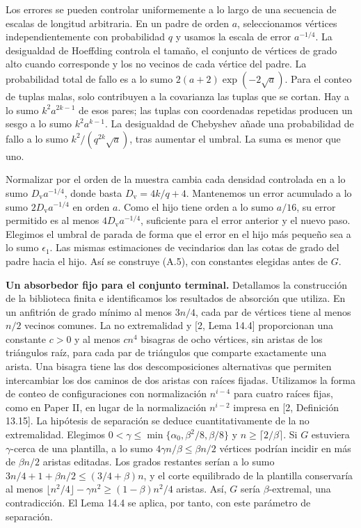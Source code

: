 \documentclass[spanish,11pt,a4paper]{article}
\begin{document}
Los errores se pueden controlar uniformemente a lo largo de una secuencia de escalas de longitud arbitraria. En un padre de orden \(a\), seleccionamos vértices independientemente con probabilidad \(q\) y usamos la escala de error \(a^{-1/4}\). La desigualdad de Hoeffding controla el tamaño, el conjunto de vértices de grado alto cuando corresponde y los no vecinos de cada vértice del padre. La probabilidad total de fallo es a lo sumo \(2(a+2)\exp(-2\sqrt a)\). Para el conteo de tuplas malas, solo contribuyen a la covarianza las tuplas que se cortan. Hay a lo sumo \(k^2a^{2k-1}\) de esos pares; las tuplas con coordenadas repetidas producen un sesgo a lo sumo \(k^2a^{k-1}\). La desigualdad de Chebyshev añade una probabilidad de fallo a lo sumo \(k^2/(q^{2k}\sqrt a)\), tras aumentar el umbral. La suma es menor que uno.

Normalizar por el orden de la muestra cambia cada densidad controlada en a lo sumo \(D_{\mathrm v}a^{-1/4}\), donde basta \(D_{\mathrm v}=4k/q+4\). Mantenemos un error acumulado a lo sumo \(2D_{\mathrm v}a^{-1/4}\) en orden \(a\). Como el hijo tiene orden a lo sumo \(a/16\), su error permitido es al menos \(4D_{\mathrm v}a^{-1/4}\), suficiente para el error anterior y el nuevo paso. Elegimos el umbral de parada de forma que el error en el hijo más pequeño sea a lo sumo \(\epsilon_1\). Las mismas estimaciones de vecindarios dan las cotas de grado del padre hacia el hijo. Así se construye (A.5), con constantes elegidas antes de \(G\).

\textbf{Un absorbedor fijo para el conjunto terminal.} Detallamos la construcción de la biblioteca finita e identificamos los resultados de absorción que utiliza. En un anfitrión de grado mínimo al menos \(3n/4\), cada par de vértices tiene al menos \(n/2\) vecinos comunes. La no extremalidad y {[}2, Lema 14.4{]} proporcionan una constante \(c>0\) y al menos \(cn^4\) bisagras de ocho vértices, sin aristas de los triángulos raíz, para cada par de triángulos que comparte exactamente una arista. Una bisagra tiene las dos descomposiciones alternativas que permiten intercambiar los dos caminos de dos aristas con raíces fijadas. Utilizamos la forma de conteo de configuraciones con normalización \(n^{i-4}\) para cuatro raíces fijas, como en Paper II, en lugar de la normalización \(n^{i-2}\) impresa en {[}2, Definición 13.15{]}. La hipótesis de separación se deduce cuantitativamente de la no extremalidad. Elegimos \(0<\gamma\le\min\{\alpha_0,\beta^2/8,\beta/8\}\) y \(n\ge\lceil2/\beta\rceil\). Si \(G\) estuviera \(\gamma\)-cerca de una plantilla, a lo sumo \(4\gamma n/\beta\le\beta n/2\) vértices podrían incidir en más de \(\beta n/2\) aristas editadas. Los grados restantes serían a lo sumo \(3n/4+1+\beta n/2\le(3/4+\beta)n\), y el corte equilibrado de la plantilla conservaría al menos \(\lfloor n^2/4\rfloor-\gamma n^2\ge(1-\beta)n^2/4\) aristas. Así, \(G\) sería \(\beta\)-extremal, una contradicción. El Lema 14.4 se aplica, por tanto, con este parámetro de separación.
\end{document}
